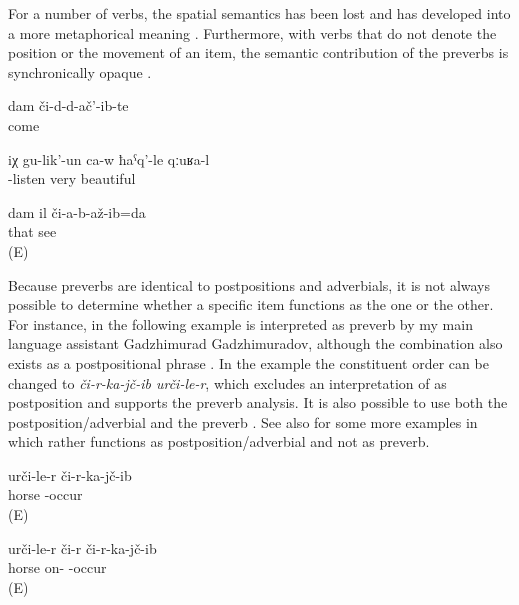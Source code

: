 For a number of verbs, the spatial semantics has been lost and has developed into a more metaphorical meaning . Furthermore, with verbs that do not denote the position or the movement of an item, the semantic contribution of the preverbs is synchronically opaque \xxref{ex:He is listening carefully to him verbs@3}{ex:I did not see it. [There is no lock}.
%
\begin{exe}
	\ex	\label{ex:(It is enough what) I experienced verbs@2}
	\gll	dam	či-d-d-ač'-ib-te\\
			come\\
	\glt	{}

	\ex	\label{ex:He is listening carefully to him verbs@3}
	\gll	iχ	gu-lik'-un	ca-w	ħaˁq'-le	qːuʁa-l\\
			-listen		very	beautiful\\
	\glt	{}

	\ex	\label{ex:I did not see it. [There is no lock}
	\gll	dam	il	či-a-b-až-ib=da\\
			that	see\\
	\glt	{} (E)
\end{exe}

Because preverbs are identical to postpositions and adverbials, it is not always possible to determine whether a specific item functions as the one or the other. For instance,  in the following example  is interpreted as preverb by my main language assistant Gadzhimurad Gadzhimuradov, although the combination  also exists as a postpositional phrase . In the example  the constituent order can be changed to \textit{či-r-ka-jč-ib urči-le-r}, which excludes an interpretation of  as postposition and supports the preverb analysis. It is also possible to use both the postposition/adverbial and the preverb . See also  for some more examples in which  rather functions as postposition/adverbial and not as preverb.
%
\begin{exe}
	\ex	\label{ex:He fell from the horse verbs}
	\gll	urči-le-r	či-r-ka-jč-ib\\
		horse	-occur\\
	\glt	{} (E)
	
		\ex	\label{ex:He fell from the horse verbs_1}
	\gll	urči-le-r či-r	či-r-ka-jč-ib\\
		horse on- -occur\\
	\glt	{} (E)
	
\end{exe}

